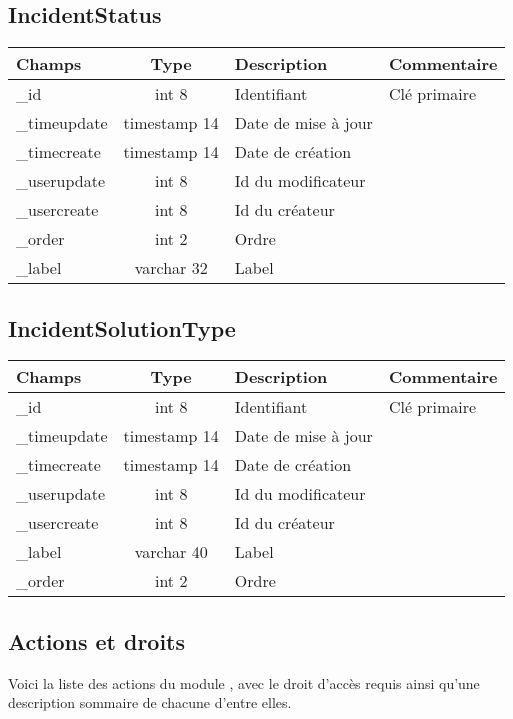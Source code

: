 \subsection{IncidentStatus}

\begin{tabular}{|p{3cm}|c|p{5.4cm}|p{2.6cm}|}
\hline
\textbf{Champs} & \textbf{Type} & \textbf{Description} & \textbf{Commentaire} \\
\hline
\_id & int 8 & Identifiant & Clé primaire \\
\hline
\_timeupdate & timestamp 14 & Date de mise à jour & \\
\hline
\_timecreate & timestamp 14 & Date de création & \\
\hline
\_userupdate & int 8 & Id du modificateur & \\
\hline
\_usercreate & int 8 & Id du créateur & \\
\hline
\_order & int 2 & Ordre & \\
\hline
\_label & varchar 32 & Label &\\
\hline
\end{tabular}


\subsection{IncidentSolutionType}

\begin{tabular}{|p{3cm}|c|p{5.4cm}|p{2.6cm}|}
\hline
\textbf{Champs} & \textbf{Type} & \textbf{Description} & \textbf{Commentaire} \\
\hline
\_id & int 8 & Identifiant & Clé primaire \\
\hline
\_timeupdate & timestamp 14 & Date de mise à jour & \\
\hline
\_timecreate & timestamp 14 & Date de création & \\
\hline
\_userupdate & int 8 & Id du modificateur & \\
\hline
\_usercreate & int 8 & Id du créateur & \\
\hline
\_label & varchar 40 & Label & \\
\hline
\_order & int 2 & Ordre & \\
\hline
\end{tabular}


\subsection{Actions et droits}

Voici la liste des actions du module \incident, avec le droit d'accès requis ainsi qu'une description sommaire de chacune d'entre elles.\\

